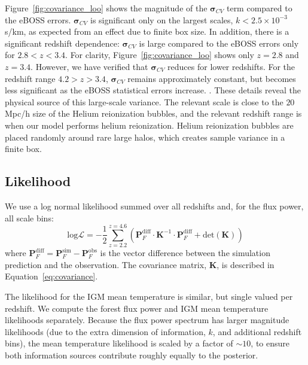 Figure~\ref{fig:covariance_loo} shows the magnitude of the $\boldsymbol{\sigma}_{CV}$ term compared to the eBOSS errors.
$\boldsymbol{\sigma}_{CV}$ is significant only on the largest scales, $k < 2.5 \times 10^{-3}$ s/km, as expected from an effect due to finite box size.
In addition, there is a significant redshift dependence: $\boldsymbol{\sigma}_{CV}$ is large compared to the eBOSS errors only for $2.8 < z < 3.4$.
For clarity, Figure~\ref{fig:covariance_loo} shows only $z=2.8$ and $z=3.4$. However, we have verified that $\boldsymbol{\sigma}_{CV}$ reduces for lower redshifts. For the redshift range $4.2 > z>3.4$, $\boldsymbol{\sigma}_{CV}$ remains approximately constant, but becomes less significant as the eBOSS statistical errors increase.  .
These details reveal the physical source of this large-scale variance.
The relevant scale is close to the $20$ Mpc/h size of the Helium reionization bubbles, and the relevant redshift range is when our model performs helium reionization.
Helium reionization bubbles are placed randomly around rare large halos, which creates sample variance in a finite box.

\subsection{Likelihood}\label{sec:likelihood}

We use a log normal likelihood summed over all redshifts and, for the flux power, all scale bins:
\begin{equation}
    \mathrm{log}\mathcal{L} = -\frac{1}{2} \sum_{z=2.2}^{z=4.6} \left(\boldsymbol{P}_F^{\mathrm{diff}} \cdot \boldsymbol{K}^{-1} \cdot \boldsymbol{P}_F^{\mathrm{diff}} + \mathrm{det}(\boldsymbol{K})\right)
    \label{eq:likelihood}
\end{equation}
where $\boldsymbol{P}_F^{\mathrm{diff}} = \boldsymbol{P}_F^{\mathrm{sim}} - \boldsymbol{P}_F^{\mathrm{obs}}$ is the vector difference between the simulation prediction and the observation.
The covariance matrix, $\boldsymbol{K}$, is described in Equation~\ref{eq:covariance}. 

The likelihood for the IGM mean temperature is similar, but single valued per redshift.
We compute the \lya forest flux power and IGM mean temperature likelihoods separately.
Because the flux power spectrum has larger magnitude likelihoods (due to the extra dimension of information, $k$, and additional redshift bins), the mean temperature likelihood is scaled by a factor of $\sim 10$, to ensure both information sources contribute roughly equally to the posterior.

